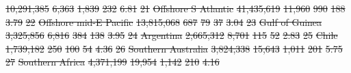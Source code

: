\documentclass[12pt,authoryear]{elsarticle}
\providecommand{\DIFdeltex}[1]{{\protect\color{red}\sout{#1}}}                      %
\providecommand{\DIFdelFL}[1]{\DIFdel{#1}} %
\providecommand{\DIFdel}[1]{\texorpdfstring{\DIFdeltex{#1}}{}} %
\begin{document}
\begin{table}[]
\DIFdelFL{10,291,385 }%
\DIFdelFL{6,363 }%
\DIFdelFL{1,839 }%
\DIFdelFL{232 }%
\DIFdelFL{6.81 }%
\DIFdelFL{21 }%
\DIFdelFL{Offshore S Atlantic                 }%
\DIFdelFL{41,435,619 }%
\DIFdelFL{11,960 }%
\DIFdelFL{990 }%
\DIFdelFL{188 }%
\DIFdelFL{3.79 }%
\DIFdelFL{22 }%
\DIFdelFL{Offshore mid-E Pacific              }%
\DIFdelFL{13,815,068 }%
\DIFdelFL{687 }%
\DIFdelFL{79 }%
\DIFdelFL{37 }%
\DIFdelFL{3.04 }%
\DIFdelFL{23 }%
\DIFdelFL{Gulf of Guinea                      }%
\DIFdelFL{3,325,856 }%
\DIFdelFL{6,816 }%
\DIFdelFL{384 }%
\DIFdelFL{138 }%
\DIFdelFL{3.95 }%
\DIFdelFL{24 }%
\DIFdelFL{Argentina                           }%
\DIFdelFL{2,665,312 }%
\DIFdelFL{8,701 }%
\DIFdelFL{115 }%
\DIFdelFL{52 }%
\DIFdelFL{2.83 }%
\DIFdelFL{25 }%
\DIFdelFL{Chile                               }%
\DIFdelFL{1,739,182 }%
\DIFdelFL{250 }%
\DIFdelFL{100 }%
\DIFdelFL{54 }%
\DIFdelFL{4.36 }%
\DIFdelFL{26 }%
\DIFdelFL{Southern Australia                  }%
\DIFdelFL{3,824,338 }%
\DIFdelFL{15,643 }%
\DIFdelFL{1,011 }%
\DIFdelFL{201 }%
\DIFdelFL{5.75 }%
\DIFdelFL{27 }%
\DIFdelFL{Southern Africa                     }%
\DIFdelFL{4,371,199 }%
\DIFdelFL{19,954 }%
\DIFdelFL{1,142 }%
\DIFdelFL{210 }%
\DIFdelFL{4.16 }%

\end{table}
\end{document}
